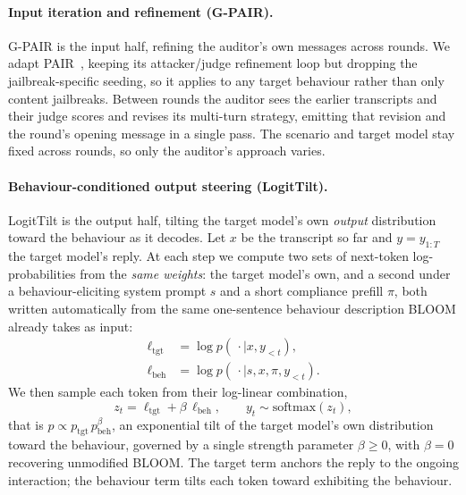 \documentclass{article}
\theoremstyle{plain}
\theoremstyle{definition}
\theoremstyle{remark}
\begin{document}
\paragraph{Input iteration and refinement (G-PAIR).}
G-PAIR is the input half, refining the auditor's own messages across rounds. We adapt PAIR~\citep{chao2023jailbreaking}, keeping its attacker/judge refinement loop but dropping the jailbreak-specific seeding, so it applies to any target behaviour rather than only content jailbreaks. Between rounds the auditor sees the earlier transcripts and their judge scores and revises its multi-turn strategy, emitting that revision and the round's opening message in a single pass. The scenario and target model stay fixed across rounds, so only the auditor's approach varies.


\paragraph{Behaviour-conditioned output steering (LogitTilt).}
LogitTilt is the output half, tilting the target model's own \emph{output} distribution toward the behaviour as it decodes.
Let $x$ be the transcript so far and $y = y_{1:T}$ the target model's reply.
At each step we compute two sets of next-token log-probabilities from the \emph{same weights}: the target model's own, and a second under a behaviour-eliciting system prompt $s$ and a short compliance prefill $\pi$, both written automatically from the same one-sentence behaviour description BLOOM already takes as input:
\begin{align}
  \ell_{\mathrm{tgt}} &= \log p(\,\cdot \mid x, y_{<t}), \label{eq:ltgt}\\
  \ell_{\mathrm{beh}} &= \log p(\,\cdot \mid s, x, \pi, y_{<t}). \label{eq:lbeh}
\end{align}
We then sample each token from their log-linear combination,
\begin{equation}\label{eq:steer}
  z_t = \ell_{\mathrm{tgt}} + \beta\,\ell_{\mathrm{beh}}, \qquad
  y_t \sim \mathrm{softmax}(z_t),
\end{equation}
that is $p \propto p_{\mathrm{tgt}}\,p_{\mathrm{beh}}^{\beta}$, an exponential tilt of the target model's own distribution toward the behaviour, governed by a single strength parameter $\beta \ge 0$, with $\beta = 0$ recovering unmodified BLOOM.
The target term anchors the reply to the ongoing interaction; the behaviour term tilts each token toward exhibiting the behaviour.
\end{document}
